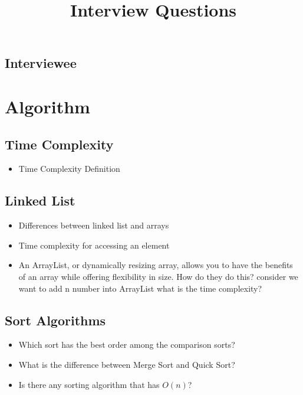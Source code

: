 \documentclass[]{book}
\begin{document}
\title{Interview Questions}

\maketitle

\subsection{Interviewee}

\section{Algorithm}

\subsection{Time Complexity}

\begin{itemize}
  \item Time Complexity Definition
\end{itemize}

\subsection{Linked List}

\begin{itemize}
  \item Differences between linked list and arrays
  \item Time complexity for accessing an element
  \item An ArrayList, or dynamically resizing array, allows you to have the benefits of an array while offering flexibility in size.
    How do they do this? consider we want to add n number into ArrayList what is the time complexity?
\end{itemize}

\subsection{Sort Algorithms}

\begin{itemize}
  \item Which sort has the best order among the comparison sorts?
  \item What is the difference between Merge Sort and Quick Sort?
  \item Is there any sorting algorithm that has $O(n)$?
\end{itemize}
\end{document}
